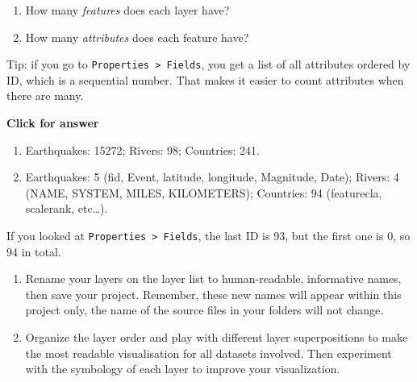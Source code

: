 \documentclass[
  letterpaper,
  DIV=11,
  numbers=noendperiod]{scrreprt}
\begin{document}
\begin{tcolorbox}[enhanced jigsaw, coltitle=black, toprule=.15mm, breakable, opacitybacktitle=0.6, left=2mm, colback=white, leftrule=.75mm, rightrule=.15mm, colbacktitle=quarto-callout-important-color!10!white, toptitle=1mm, titlerule=0mm, colframe=quarto-callout-important-color-frame, arc=.35mm, bottomtitle=1mm, opacityback=0, bottomrule=.15mm, title=\textcolor{quarto-callout-important-color}{\faExclamation}\hspace{0.5em}{Stop and Think}]

\begin{enumerate}
\def\labelenumi{\alph{enumi})}
\item
  How many \emph{features} does each layer have?
\item
  How many \emph{attributes} does each feature have?
\end{enumerate}

Tip: if you go to \texttt{Properties\ \textgreater{}\ Fields}, you get a
list of all attributes ordered by ID, which is a sequential number. That
makes it easier to count attributes when there are many.

\end{tcolorbox}

\begin{tcolorbox}[enhanced jigsaw, toprule=.15mm, breakable, left=2mm, colframe=quarto-callout-important-color-frame, colback=white, arc=.35mm, leftrule=.75mm, opacityback=0, rightrule=.15mm, bottomrule=.15mm]

\vspace{-3mm}\textbf{Click for answer}\vspace{3mm}

\begin{enumerate}
\def\labelenumi{\alph{enumi})}
\item
  Earthquakes: 15272; Rivers: 98; Countries: 241.
\item
  Earthquakes: 5 (fid, Event, latitude, longitude, Magnitude, Date);
  Rivers: 4 (NAME, SYSTEM, MILES, KILOMETERS); Countries: 94
  (featurecla, scalerank, etc\ldots).
\end{enumerate}

If you looked at \texttt{Properties\ \textgreater{}\ Fields}, the last
ID is 93, but the first one is 0, so 94 in total.

\end{tcolorbox}

\begin{enumerate}
\def\labelenumi{(\arabic{enumi})}
\setcounter{enumi}{68}
\item
  Rename your layers on the layer list to human-readable, informative
  names, then save your project. Remember, these new names will appear
  within this project only, the name of the source files in your folders
  will not change.
\item
  Organize the layer order and play with different layer superpositions
  to make the most readable visualisation for all datasets involved.
  Then experiment with the symbology of each layer to improve your
  visualization.
\end{enumerate}
\end{document}
